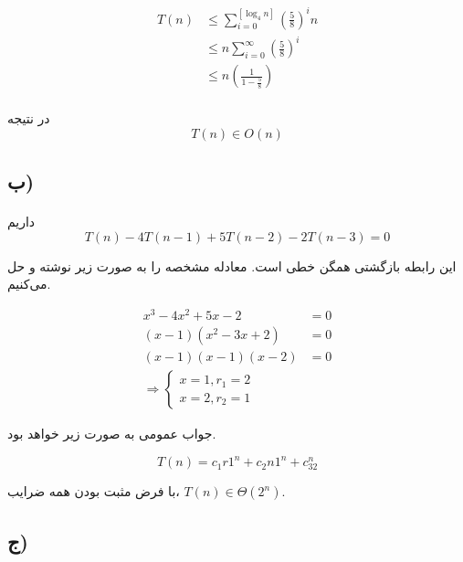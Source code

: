 \documentclass{article}
\begin{document}
	\begin{align*}
		T(n) &\le \sum_{i=0}^{[\log_4 n]} \left(\frac{5}{8}\right)^in \\
		&\le n \sum_{i=0}^{\infty} \left(\frac{5}{8}\right)^i \\
		&\le n \left(\frac{1}{1-\frac{5}{8}}\right) \\
	\end{align*}

	در نتیجه
	\begin{equation*}
		T(n) \in O(n)
	\end{equation*}

	\subsection*{ب)}
	\paragraph*{}

	داریم
	\begin{equation*}
		T(n) - 4T(n-1) + 5T(n-2) - 2T(n-3) = 0
	\end{equation*}

	این رابطه بازگشتی همگن خطی است. معادله مشخصه را به صورت زیر نوشته و حل می‌کنیم.

	\begin{align*}
		x^3 - 4x^2 + 5x - 2 &= 0 \\
		(x-1)(x^2 - 3x + 2) &= 0 \\
		(x-1)(x-1)(x-2) &= 0 \\
		\Rightarrow
		\begin{cases}
			x = 1, r_1 = 2 \\
			x = 2, r_2 = 1
		\end{cases}
	\end{align*}

	جواب عمومی به صورت زیر خواهد بود.

	\begin{equation*}
		T(n) = c_1r1^n + c_2n1^n + c_32^n
	\end{equation*}

	با فرض مثبت بودن همه ضرایب،
	$T(n) \in \Theta(2^n)$.

	\subsection*{ج)}
	\paragraph*{}
\end{document}
